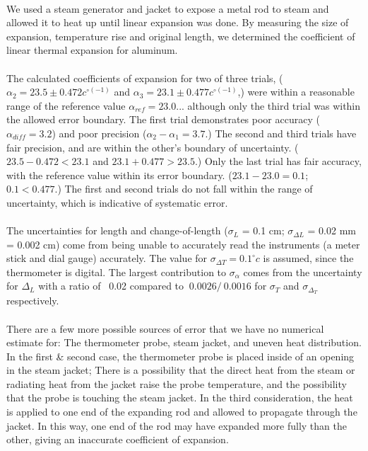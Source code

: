 \documentclass[10pt,letterpaper]{report}
\begin{document}
\paragraph*{}
	 We used a steam generator and jacket to expose a metal rod to steam and allowed it to heat up until linear expansion was done. By measuring the size of expansion, temperature rise and original length, we determined the coefficient of linear thermal expansion for aluminum. \\
	 \\
	The calculated coefficients of expansion for two of three trials, ($\alpha_{2} = 23.5 \pm 0.472 c^{\circ (-1)} $ and $\alpha_{3} = 23.1 \pm 0.477 c^{\circ (-1)} $,) were within a reasonable range of the reference value $\alpha_{ref} = 23.0$... although only the third trial was within the allowed error boundary. The first trial demonstrates poor accuracy ($\alpha_{diff} = 3.2$) and poor precision ($\alpha_2 - \alpha_1 = 3.7$.) The second and third trials have fair precision, and are within the other's boundary of uncertainty. 
	($23.5 - 0.472 < 23.1$ and $ 23.1 + 0.477 > 23.5$.) Only the last trial has fair accuracy, with the reference value within its error boundary. ($23.1 - 23.0 = 0.1$; $0.1 < 0.477.$)
	The first and second trials do not fall within the range of uncertainty, which is indicative of systematic error. \\
	\\
	The uncertainties for length and change-of-length ($\sigma_L$ = 0.1 cm; $\sigma_{\Delta L}$ = 0.02 mm = 0.002 cm) come from being unable to accurately read the instruments (a meter stick and dial gauge) accurately. The value for $\sigma_{\Delta T} = 0.1 ^\circ c$ is assumed, since the thermometer is digital. The largest contribution to $\sigma_\alpha$ comes from the uncertainty for $\Delta_L$ with a ratio of ~0.02 compared to $~0.0026 / ~0.0016$ for $\sigma_T$ and $\sigma_{\Delta_T}$ respectively. \\
	\\
	There are a few more possible sources of error that we have no numerical estimate for: The thermometer probe, steam jacket, and uneven heat distribution. In the first \& second case, the thermometer probe is placed inside of an opening in the steam jacket; There is a possibility that the direct heat from the steam or radiating heat from the jacket raise the probe temperature, and the possibility that the probe is touching the steam jacket. In the third consideration, the heat is applied to one end of the expanding rod and allowed to propagate through the jacket. In this way, one end of the rod may have expanded more fully than the other, giving an inaccurate coefficient of expansion.
	
\end{document}
